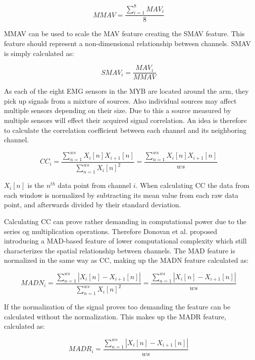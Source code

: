 \begin{equation} \label{eq:MMAV}
MMAV=\frac{\sum_{i=1}^{8}MAV_i}{8}
\end{equation}

MMAV can be used to scale the MAV feature creating the SMAV feature. This feature should represent a non-dimensional relationship between channels. SMAV is simply calculated as:

\begin{equation} \label{eq:SMAV}
SMAV_i=\frac{MAV_i}{MMAV}
\end{equation}

As each of the eight EMG sensors in the MYB are located around the arm, they pick up signals from a mixture of sources. Also individual sources may affect multiple sensors depending on their size. Due to this a source measured by multiple sensors will effect their acquired signal correlation. An idea is therefore to calculate the correlation coefficient between each channel and its neighboring channel.  

\begin{equation} \label{eq:CC}
CC_i=\frac{\sum_{n=1}^{ws}X_i[n]X_{i+1}[n]}{\sum_{n=1}^{ws}X_i[n]^2}=\frac{\sum_{n=1}^{ws}X_i[n]X_{i+1}[n]}{ws}
\end{equation}

$X_i[n]$ is the $n^{th}$ data point from channel $i$. When calculating CC the data from each window is normalized by subtracting its mean value from each raw data point, and afterwards divided by their standard deviation. 

Calculating CC can prove rather demanding in computational power due to the series og multiplication operations. Therefore Donovan et al. \cite{Donovan2017} proposed introducing a MAD-based feature of lower computational complexity which still characterizes the spatial relationship between channels. The MAD feature is normalized in the same way as CC, making up the MADN feature calculated as: 

\begin{equation} \label{eq:MADN}
MADN_i=\frac{\sum_{n=1}^{ws}|X_i[n]-X_{i+1}[n]|}{\sum_{n=1}^{ws}X_i[n]^2}=\frac{\sum_{n=1}^{ws}|X_i[n]-X_{i+1}[n]|}{ws}
\end{equation}

If the normalization of the signal proves too demanding the feature can be calculated without the normalization. This makes up the MADR feature, calculated as:

\begin{equation} \label{eq:MADR}
MADR_i=\frac{\sum_{n=1}^{ws}|X_i[n]-X_{i+1}[n]|}{ws}
\end{equation}

